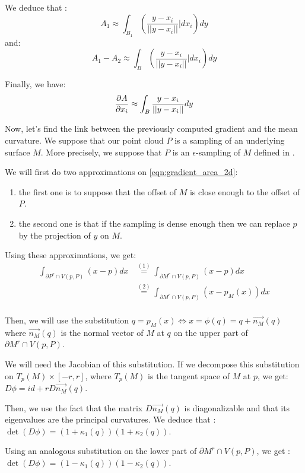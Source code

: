 We deduce that :
$$ A_1 \approx \int_{B_1} \left( \frac{y - x_i}{||y - x_i||} | dx_i \right) dy $$
and:
$$ A_1 - A_2 \approx \int_{B} \left( \frac{y - x_i}{||y - x_i||} | dx_i \right) dy $$

Finally, we have:
\begin{equation}
    \label{eqn:gradient_area_2d}
    \frac{\partial{A}}{\partial{x_i}} \approx \int_{B} \frac{y - x_i}{||y - x_i||} dy
\end{equation}

Now, let's find the link between the previously computed gradient and the mean
curvature. We suppose that our point cloud $ P $ is a sampling of an underlying
surface $ M $. More precisely, we suppose that $ P $ is an $ \epsilon $-sampling
of $ M $ defined in \cite{amenta1999surface}.

We will first do two approximations on \ref{eqn:gradient_area_2d}:
\begin{enumerate}
    \item the first one is to suppose that the offset of $ M $ is close enough to the offset of $ P $.
    \item the second one is that if the sampling is dense enough then we can replace $ p $
        by the projection of $ y $ on $ M $.
\end{enumerate}

Using these approximations, we get:
\begin{align*}
    \int_{\partial{P^r} \cap V(p, P)} (x - p) dx & \stackrel{(1)}{=} \int_{\partial{M^r} \cap V(p,
        P)} (x - p) dx \\
    &\stackrel{(2)}{=} \int_{\partial{M^r} \cap V(p, P)} (x - p_M(x)) dx \\
\end{align*}

Then, we will use the substitution $ q = p_M(x) \iff x = \phi(q) = q + \vec{n_M}(q) $
where $ \vec{n_M}(q) $ is the normal vector of $ M $ at $ q $ on the upper part
of $ \partial{M^r} \cap V(p, P) $.

We will need the Jacobian of this substitution. If we decompose this
substitution on $ T_p(M) \times [-r, r] $, where $ T_p(M) $ is the tangent space
of $ M $ at $ p $, we get: $ D \phi = id + r D \vec{n_M}(q) $.

Then, we use the fact that the matrix $ D \vec{n_M}(q) $ is diagonalizable and
that its eigenvalues are the principal curvatures.
We deduce that : $ \det (D \phi) = (1 + \kappa_1(q)) (1 + \kappa_2(q)) $.

Using an analogous substitution on the lower part of $ \partial{M^r} \cap V(p,
P) $, we get : $ \det (D \phi) = (1 - \kappa_1(q)) (1 - \kappa_2(q)) $.

